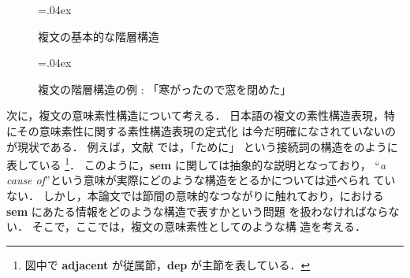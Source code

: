 \begin{figure}[hbtp]
\begin{center}
\unitlength=.04ex
\end{center}
\caption{複文の基本的な階層構造}
\end{figure}

\begin{figure}[htbp]
\begin{center}
\unitlength=.04ex
\end{center}
\caption{複文の階層構造の例 : 「寒がったので窓を閉めた」}
\end{figure}

次に，複文の意味素性構造について考える．
日本語の複文の素性構造表現，特にその意味素性に関する素性構造表現の定式化
は今だ明確になされていないのが現状である．
例えば，文献 \cite{Tonoike:HierarchicalClauseStructure}では，「ために」
という接続詞の構造をのように表している
\footnote{図中で {\bf adjacent} が従属節，{\bf dep} が主節を表している．}．
このように，{\bf sem} に関しては抽象的な説明となっており， ``{\it a
cause of\/}''という意味が実際にどのような構造をとるかについては述べられ
ていない．
しかし，本論文では節間の意味的なつながりに触れており，における {\bf sem} にあたる情報をどのような構造で表すかという問題
を扱わなければならない．
そこで，ここでは，複文の意味素性としてのような構
造を考える．

